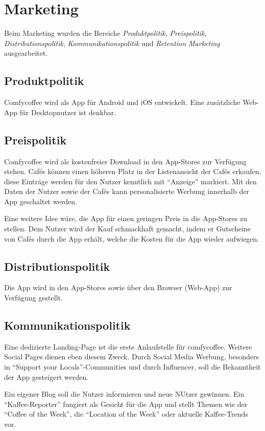 \section{Marketing}
\label{sec:marketing}
Beim Marketing wurden die Bereiche \emph{Produktpolitik}, \emph{Preispolitik}, \emph{Distributionspolitik}, \emph{Kommunikationspolitik} und \emph{Retention Marketing} ausgearbeitet.

\subsection{Produktpolitik}
Comfycoffee wird als App für Android und iOS entwickelt. Eine zusätzliche Web-App für Desktopnutzer ist denkbar.

\subsection{Preispolitik}
Comfycoffee wird als kostenfreier Download in den App-Stores zur Verfügung stehen. Cafés können einen höheren Platz in der Listenansicht der Cafés erkaufen, diese Einträge werden für den Nutzer kenntlich mit ``Anzeige'' markiert. Mit den Daten der Nutzer sowie der Cafés kann personalisierte Werbung innerhalb der App geschaltet werden.

Eine weitere Idee wäre, die App für einen geringen Preis in die App-Stores zu stellen. Dem Nutzer wird der Kauf schmackhaft gemacht, indem er Gutscheine von Cafés durch die App erhält, welche die Kosten für die App wieder aufwiegen.

\subsection{Distributionspolitik}
Die App wird in den App-Stores sowie über den Browser (Web-App) zur Verfügung gestellt.

\subsection{Kommunikationspolitik}
Eine dedizierte Landing-Page ist die erste Anlaufstelle für comfycoffee. Weitere Social Pages dienen eben diesem Zweck. Durch Social Media Werbung, besonders in ``Support your Locals''-Communities und durch Influencer, soll die Bekanntheit der App gesteigert werden. 

Ein eigener Blog soll die Nutzer informieren und neue NUtzer gewinnen. Ein ``Kaffee-Reporter'' fungiert als Gesicht für die App und stellt Themen wie der ``Coffee of the Week'', die ``Location of the Week'' oder aktuelle Kaffee-Trends vor.


